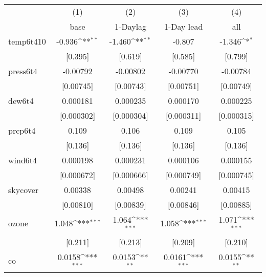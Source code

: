 {
\def\sym#1{\ifmmode^{#1}\else\(^{#1}\)\fi}
\begin{tabular}{l*{4}{c}}
\hline\hline
            &\multicolumn{1}{c}{(1)}&\multicolumn{1}{c}{(2)}&\multicolumn{1}{c}{(3)}&\multicolumn{1}{c}{(4)}\\
            &\multicolumn{1}{c}{base}&\multicolumn{1}{c}{1-Daylag}&\multicolumn{1}{c}{1-Day lead}&\multicolumn{1}{c}{all}\\
\hline
temp6t410   &      -0.936\sym{**} &      -1.460\sym{**} &      -0.807         &      -1.346\sym{*}  \\
            &     [0.395]         &     [0.619]         &     [0.585]         &     [0.799]         \\
[1em]
press6t4    &    -0.00792         &    -0.00802         &    -0.00770         &    -0.00784         \\
            &   [0.00745]         &   [0.00743]         &   [0.00751]         &   [0.00749]         \\
[1em]
dew6t4      &    0.000181         &    0.000235         &    0.000170         &    0.000225         \\
            &  [0.000302]         &  [0.000304]         &  [0.000311]         &  [0.000315]         \\
[1em]
prcp6t4     &       0.109         &       0.106         &       0.109         &       0.105         \\
            &     [0.136]         &     [0.136]         &     [0.136]         &     [0.136]         \\
[1em]
wind6t4     &    0.000198         &    0.000231         &    0.000106         &    0.000155         \\
            &  [0.000672]         &  [0.000666]         &  [0.000749]         &  [0.000745]         \\
[1em]
skycover    &     0.00338         &     0.00498         &     0.00241         &     0.00415         \\
            &   [0.00810]         &   [0.00839]         &   [0.00846]         &   [0.00885]         \\
[1em]
ozone       &       1.048\sym{***}&       1.064\sym{***}&       1.058\sym{***}&       1.071\sym{***}\\
            &     [0.211]         &     [0.213]         &     [0.209]         &     [0.210]         \\
[1em]
co          &      0.0158\sym{***}&      0.0153\sym{**} &      0.0161\sym{***}&      0.0155\sym{**} \\

\end{tabular}}
